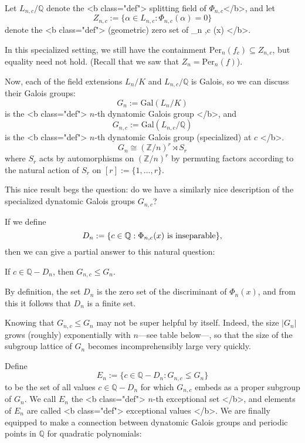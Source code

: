 Let \( L_{n,c} / \mathbb{Q}  \) denote the <b class="def"> splitting field of \(  \Phi_{n ,c }  \)</b>, and let
\[ 
  Z_{n,c}:= \{ \alpha \in L_{n,c} :  \Phi_{n ,c }  \left( \alpha \right)    = 0\} 
\] 
denote the <b class="def"> (geometric) zero set of  \Phi_{n ,c } (x)    </b>.

In this specialized setting, we still have the containment \( \mathrm{Per}_{ n } (f_c)  \subseteq  Z_{n,c} \), but equality need not hold. (Recall that we saw that \( Z_n = \mathrm{Per}_{ n } (f)   \)).

Now, each of the field extensions \( L_n / K \) and \( L_{n,c} / \mathbb{Q}  \) is Galois, so we can discuss their Galois groups:  
\[ 
  G_n:= \mathrm{Gal}(L_n/K)   
\] 
is the <b class="def"> \( n \)-th dynatomic Galois group </b>, and 
\[ 
   G_{n,c}:= \mathrm{Gal}(L_{n,c} /\mathbb{Q} )   
\]
is the <b class="def"> \( n \)-th dynatomic Galois group (specialized) at \( c \)  </b>. 
\[ 
  G_n \cong \left( \mathbb{Z} / n \right)^{ r } \rtimes S_{ r }    
\] 
where \( S_r \) acts by automorphisms on \( \left( \mathbb{Z} / n \right)^{ r }   \) by permuting factors according to the natural action of \( S_r \) on \( [r]:=\{1 , \ldots, r\} \).  

This nice result begs the question: do we have a similarly nice description of the specialized dynatomic Galois groups \( G_{n,c}  \)?

If we define
\[ 
  D_n := \{ c \in \mathbb{Q} :  \text{\( \Phi_{n ,c } (x) \) is inseparable}   \},
\]
then we can give a partial answer to this natural question: 

If \( c \in \mathbb{Q} -D_n \), then \( G_{n,c} \le G_n \).  

By definition, the set \( D_n \) is the zero set of the discriminant of \(  \Phi_{n  }  \left( x \right) \), and from this it follows that \( D_n \) is a finite set. 

Knowing that \( G_{n,c} \le G_n \) may not be super helpful by itself. Indeed, the size \(  \left| G_n \right|   \) grows (roughly) exponentially with \( n \)---see table below---, so that the size of the subgroup lattice of \( G_n \) becomes incomprehensibly large very quickly.

Define
\[ 
  E_n := \{ c \in \mathbb{Q} - D_n : G_{n,c} \lneq G_n  \} 
\]
to be the set of all values \( c \in \mathbb{Q} -D_n \) for which \( G_{n,c}  \) embeds as a proper subgroup of \( G_n \). We call \( E_n \) the <b class="def"> \( n \)-th exceptional set </b>, and elements of \( E_n \) are called <b class="def"> exceptional values </b>. We are finally equipped to make a connection between dynatomic Galois groups and periodic points in \( \mathbb{Q}  \) for quadratic polynomials: 

